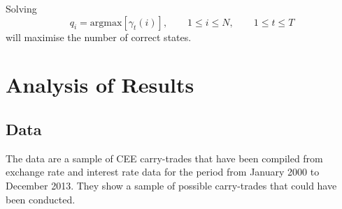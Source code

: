 \documentclass[12pt, a4paper, oneside]{article} %
\begin{document}
Solving
\begin{equation}
q_i = \text{argmax} [\gamma_t(i)], \qquad 1 \leq i \leq N, \qquad 1 \leq t \leq T  
\end{equation}
will maximise the number of correct states. 










\section{Analysis of Results}
\subsection{Data}
The data are a sample of CEE carry-trades that have been compiled from exchange rate and interest rate data for the period from January 2000 to December 2013.  They show a sample of possible carry-trades that could have been conducted. 
\end{document}
